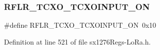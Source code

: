 \subsubsection{\texorpdfstring{R\+F\+L\+R\+\_\+\+T\+C\+X\+O\+\_\+\+T\+C\+X\+O\+I\+N\+P\+U\+T\+\_\+\+ON}{RFLR\_TCXO\_TCXOINPUT\_ON}}
{\footnotesize\ttfamily \#define R\+F\+L\+R\+\_\+\+T\+C\+X\+O\+\_\+\+T\+C\+X\+O\+I\+N\+P\+U\+T\+\_\+\+ON~0x10}



Definition at line 521 of file sx1276\+Regs-\/\+Lo\+Ra.\+h.

